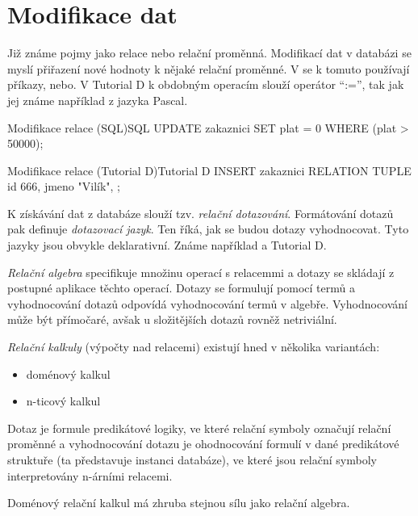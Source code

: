 \section{Modifikace dat}
Již známe pojmy jako relace nebo relační proměnná. Modifikací dat v databázi se myslí přiřazení nové hodnoty k nějaké relační proměnné. V  se k tomuto používají příkazy, nebo. V Tutorial D k obdobným operacím slouží operátor \enquote{:=}, tak jak jej známe například z jazyka Pascal.
\begin{upcode}{Modifikace relace (SQL)}{}{SQL}
UPDATE	zakaznici
SET		plat = 0
WHERE	(plat > 50000);
\end{upcode}
\begin{upcode}{Modifikace relace (Tutorial D)}{}{Tutorial D}
INSERT zakaznici RELATION {TUPLE {id 666, jmeno "Vilík", }};
\end{upcode}
K získávání dat z databáze slouží tzv. \textit{relační dotazování}. Formátování dotazů pak definuje \textit{dotazovací jazyk}. Ten říká, jak se budou dotazy vyhodnocovat. Tyto jazyky jsou obvykle deklarativní. Známe například  a Tutorial D.

\textit{Relační algebra} specifikuje množinu operací s relacemmi a dotazy se skládají z postupné aplikace těchto operací. Dotazy se formulují pomocí termů a vyhodnocování dotazů odpovídá vyhodnocování termů v algebře. Vyhodnocování může být přímočaré, avšak u složitějších dotazů rovněž netriviální.

\textit{Relační kalkuly} (výpočty nad relacemi) existují hned v několika variantách:
\begin{itemize}
\item doménový kalkul
\item n-ticový kalkul
\end{itemize}
Dotaz je formule predikátové logiky, ve které relační symboly označují relační proměnné a vyhodnocování dotazu je ohodnocování formulí v dané predikátové struktuře (ta představuje instanci databáze), ve které jsou relační symboly interpretovány n-árními relacemi.

Doménový relační kalkul má zhruba stejnou sílu jako relační algebra.


